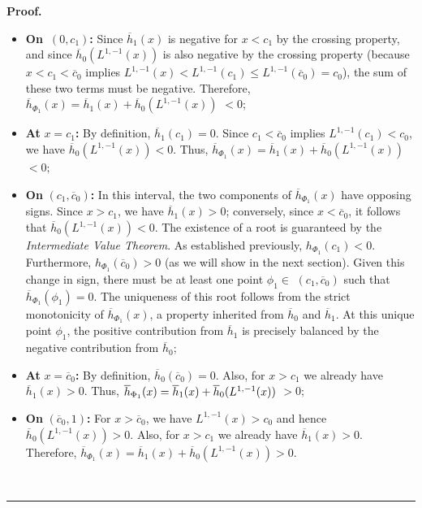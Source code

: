 \documentclass[onecolumn]{article}
\newenvironment{proof}[1][Proof]{\noindent\textbf{#1.} }{\ \rule{0.5em}{0.5em}}
\begin{document}
\begin{proof}
\begin{itemize}
\item \textbf{On\ }$(0,c_{1})$\textbf{:} Since $\overline{h}_{1}(x)$ is
negative for $x<c_{1}$ by the crossing property, and since $\overline{h}%
_{0}(L^{1,-1}(x))$ is also negative by the crossing property (because $%
x<c_{1}<\overline{c}_{0}$ implies $L^{1,-1}(x)<L^{1,-1}(c_{1})\leq L^{1,-1}(%
\overline{c}_{0})=c_{0}$), the sum of these two terms must be negative.
Therefore,$\overline{h}_{\Phi _{1}}(x)=\overline{h}_{1}(x)+\overline{h}%
_{0}(L^{1,-1}(x))$ $<0$;

\item \textbf{At }$x=c_{1}$\textbf{:} By definition, $\overline{h}%
_{1}(c_{1})=0$. Since $c_{1}<\overline{c}_{0}$ implies $%
L^{1,-1}(c_{1})<c_{0} $, we have $\overline{h}_{0}(L^{1,-1}(x))<0$. Thus, $%
\overline{h}_{\Phi _{1}}(x)=\overline{h}_{1}(x)+\overline{h}%
_{0}(L^{1,-1}(x)) $ $<0;$

\item \textbf{On }$(c_{1},\overline{c}_{0})$\textbf{:} In this interval, the
two components of $\overline{h}_{\Phi _{1}}(x)$ have opposing signs. Since $%
x>c_{1}$, we have $\overline{h}_{1}(x)>0$; conversely, since $x<\overline{c}%
_{0}$, it follows that $\overline{h}_{0}(L^{1,-1}(x))<0$. The existence of a
root is guaranteed by the \textit{Intermediate Value Theorem}. As
established previously, $h_{\Phi _{1}}(c_{1})<0$. Furthermore, $h_{\Phi
_{1}}(\overline{c}_{0})>0$ (as we will show in the next section). Given this
change in sign, there must be at least one point $\phi _{1}\in $ $(c_{1},%
\overline{c}_{0})$ such that $\overline{h}_{\Phi _{1}}(\phi _{1})=0$. The
uniqueness of this root follows from the strict monotonicity of $\overline{h}%
_{\Phi _{1}}(x)$, a property inherited from $\overline{h}_{0}$ and $%
\overline{h}_{1}$. At this unique point $\phi _{1}$, the positive
contribution from $\overline{h}_{1}$ is precisely balanced by the negative
contribution from $\overline{h}_{0}$;

\item \textbf{At }$x=\overline{c}_{0}$\textbf{:} By definition, $\overline{h}%
_{0}(\overline{c}_{0})=0$. Also, for $x>c_{1}$ we already have $\overline{h}%
_{1}(x)>0$. Thus, $\overline{h}_{\Phi _{1}}(x)=\overline{h}_{1}(x)+\overline{%
h}_{0}(L^{1,-1}(x))$ $>0;$

\item \textbf{On }$(\overline{c}_{0},1)$\textbf{:} For $x>\overline{c}_{0}$,
we have $L^{1,-1}(x)>c_{0}$ and hence $\overline{h}_{0}(L^{1,-1}(x))>0$.
Also, for $x>c_{1}$ we already have $\overline{h}_{1}(x)>0$. Therefore, $%
\overline{h}_{\Phi _{1}}(x)=\overline{h}_{1}(x)+\overline{h}%
_{0}(L^{1,-1}(x))>0.$
\end{itemize}


\end{proof}
\end{document}
